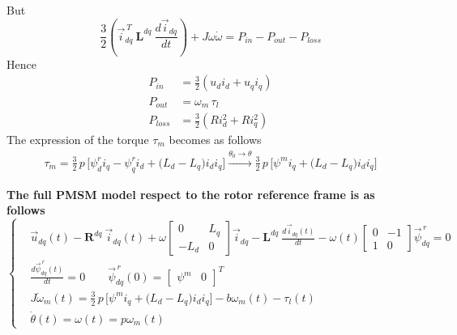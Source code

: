 \documentclass[11pt,a4paper]{article}
\numberwithin{equation}{section}
\theoremstyle{it}
\theoremstyle{definition}
\begin{document}
\begin{onehalfspace}
\begin{equation*}
\end{equation*}
But 
\begin{equation*}
	\frac{3}{2} \left( \vec{i}_{dq}^{\ T}\ \mathbf{L}^{dq}\ \frac{d\vec{i}_{dq}}{dt}\right) + J\omega\dot{\omega}= P_{in}-P_{out}-P_{loss}
\end{equation*}
Hence
\begin{equation*}
	\begin{aligned}
		P_{in} &= \frac{3}{2}\left( u_d i_d+u_q i_q\right)  \\[6pt]
		P_{out} &= \omega_m\,\tau_l \\[6pt]
		P_{loss} &= \frac{3}{2}\left( Ri_d^2+Ri_q^2\right) 
	\end{aligned} 
\end{equation*}
The expression of the torque $\tau_m$ becomes as follows
\begin{equation}
	\begin{aligned}
		\tau_m = \frac{3}{2}\,p\,\Big[\psi^r_{d}i_{q}-\psi^r_{q}i_{d} + \big(L_d-L_q\big)i_di_q\Big] \xrightarrow{\theta_0\rightarrow\theta} \frac{3}{2}\,p\,\Big[\psi^mi_{q} + \big(L_d-L_q\big)i_di_q\Big]
	\end{aligned} 
\end{equation}

\begin{mybox}
	\textbf{The full PMSM model respect to the rotor reference frame is as follows}
	\begin{equation}\label{twophase_model_ref_2}
		\left\lbrace \begin{aligned}
			& \vec{u}_{dq}(t)-\mathbf{R}^{dq}\ \vec{i}_{dq}(t)+ \omega\begin{bmatrix} 0 & L_q\\ -L_d & 0 \end{bmatrix}\vec{i}_{dq} -\mathbf{L}^{dq}\ \frac{d\vec{i}_{dq}(t)}{dt}-\omega(t) \begin{bmatrix} 0 & -1 \\ 1 & 0\end{bmatrix} \vec{\psi}^{\,r}_{dq} = 0 \\[6pt]
			& \frac{d\vec{\psi}^{\,r}_{dq}(t)}{dt} = 0 \qquad \vec{\psi}^{\,r}_{dq}(0) = \begin{bmatrix} \psi^m &  0 \end{bmatrix}^T \\[6pt]
			& J\dot{\omega}_m(t) = \frac{3}{2}\,p\,\Big[\psi^mi_{q} + \big(L_d-L_q\big)i_di_q\Big] -b\omega_m(t)-\tau_l(t) \\[6pt]
			& \dot{\theta}(t) = \omega(t) = p\omega_m(t)
		\end{aligned} \right. 
	\end{equation}
\end{mybox}

\end{onehalfspace}
\end{document}
